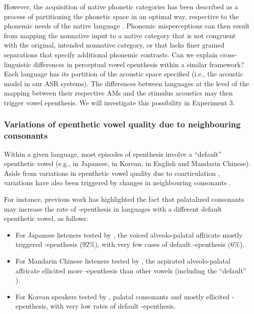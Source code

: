 {However, the acquisition of native phonetic categories has been described as a process of partitioning the phonetic space in an optimal way, respective to the phonemic needs of the native language \cite{best1994, kuhl1995}. Phonemic misperceptions can then result from mapping the nonnative input to a native category that is not congruent with the original, intended nonnative category, or that lacks finer grained separations that specify additional phonemic contrasts.    
Can we explain cross-linguistic differences in perceptual vowel epenthesis within a similar framework? Each language has its partition of the acoustic space specified (i.e., the acoustic model in our ASR systems). The differences between languages at the level of the mapping between their respective AMs and the stimulus acoustics may then trigger vowel epenthesis. We will investigate this possibility in Experiment 3. 
 
\subsubsection{Variations of epenthetic vowel quality due to neighbouring consonants} 
Within a given language, most episodes of epenthesis involve a ``default'' epenthetic vowel (e.g., \textipa{[W]} in Japanese, \textipa{[1]} in Korean, \textipa{[@]} in English and Mandarin Chinese). Aside from variations in epenthetic vowel quality due to coarticulation \cite{dupoux2011, guekozIS17, guekozJASA17}, variations have also been triggered by changes in neighbouring consonants \cite{mattingley2015, durvasula2015, durvasula2018}.

For instance, previous work has highlighted the fact that palatalized consonants may increase the rate of -epenthesis in languages with a different default epenthetic vowel, as follows:

\begin{itemize}
\item For Japanese listeners tested by \cite{mattingley2015}, the voiced alveolo-palatal affricate  mostly triggered \textipa{[i]}-epenthesis ($92\%$), with very few cases of default \textipa{[W]}-epenthesis ($6\%$).
\item For Mandarin Chinese listeners tested by \cite{durvasula2018}, the aspirated alveolo-palatal affricate  ellicited more \textipa{[i]}-epenthesis than other vowels (including the ``default'' \textipa{[@]}).
  \item For Korean speakers tested by \cite{durvasula2015}, palatal consonants  and  mostly ellicited \textipa{[i]}-epenthesis, with very low rates of default \textipa{[1]}-epenthesis.  
\end{itemize}

}
